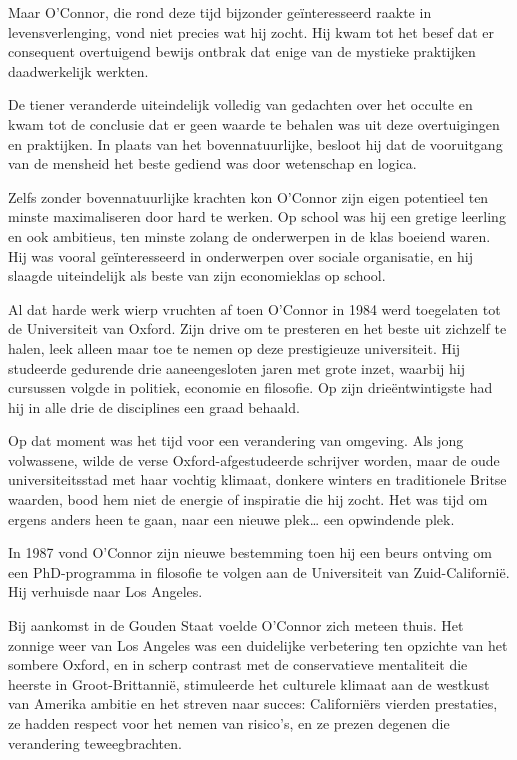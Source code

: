 \documentclass[smalldemyvopaper,11pt,twoside,onecolumn,openright,extrafontsizes,hidelinks]{memoir}
\begin{document}
Maar O'Connor, die rond deze tijd bijzonder geïnteresseerd raakte in
levensverlenging, vond niet precies wat hij zocht. Hij kwam tot het
besef dat er consequent overtuigend bewijs ontbrak dat enige van de
mystieke praktijken daadwerkelijk werkten.

De tiener veranderde uiteindelijk volledig van gedachten over het
occulte en kwam tot de conclusie dat er geen waarde te behalen was uit
deze overtuigingen en praktijken. In plaats van het bovennatuurlijke,
besloot hij dat de vooruitgang van de mensheid het beste gediend was
door wetenschap en logica.

Zelfs zonder bovennatuurlijke krachten kon O'Connor zijn eigen
potentieel ten minste maximaliseren door hard te werken. Op school was
hij een gretige leerling en ook ambitieus, ten minste zolang de
onderwerpen in de klas boeiend waren. Hij was vooral geïnteresseerd in
onderwerpen over sociale organisatie, en hij slaagde uiteindelijk als
beste van zijn economieklas op school.

Al dat harde werk wierp vruchten af toen O'Connor in 1984 werd
toegelaten tot de Universiteit van Oxford. Zijn drive om te presteren en
het beste uit zichzelf te halen, leek alleen maar toe te nemen op deze
prestigieuze universiteit. Hij studeerde gedurende drie aaneengesloten
jaren met grote inzet, waarbij hij cursussen volgde in politiek,
economie en filosofie. Op zijn drieëntwintigste had hij in alle drie de
disciplines een graad behaald.

Op dat moment was het tijd voor een verandering van omgeving. Als jong
volwassene, wilde de verse Oxford-afgestudeerde schrijver worden, maar
de oude universiteitsstad met haar vochtig klimaat, donkere winters en
traditionele Britse waarden, bood hem niet de energie of inspiratie die
hij zocht. Het was tijd om ergens anders heen te gaan, naar een nieuwe
plek\ldots{} een opwindende plek.

In 1987 vond O'Connor zijn nieuwe bestemming toen hij een beurs ontving
om een PhD-programma in filosofie te volgen aan de Universiteit van
Zuid-Californië. Hij verhuisde naar Los Angeles.

Bij aankomst in de Gouden Staat voelde O'Connor zich meteen thuis. Het
zonnige weer van Los Angeles was een duidelijke verbetering ten opzichte
van het sombere Oxford, en in scherp contrast met de conservatieve
mentaliteit die heerste in Groot-Brittannië, stimuleerde het culturele
klimaat aan de westkust van Amerika ambitie en het streven naar succes:
Californiërs vierden prestaties, ze hadden respect voor het nemen van
risico's, en ze prezen degenen die verandering teweegbrachten.
\end{document}
